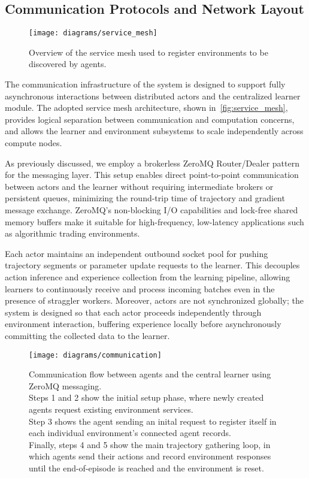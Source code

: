 \documentclass[11pt]{article}
\begin{document}
    \subsection{Communication Protocols and Network Layout}
    \label{subsec:communication}

    \begin{figure}[htb]
        \centering
        \texttt{[image: diagrams/service\_mesh]}
        \caption{Overview of the service mesh used to register environments to be discovered by agents.}
        \label{fig:service_mesh}
    \end{figure}

    The communication infrastructure of the system is designed to support fully asynchronous interactions
    between distributed actors and the centralized learner module.
    The adopted service mesh architecture, shown in~\autoref{fig:service_mesh}, provides logical separation between communication and computation concerns,
    and allows the learner and environment subsystems to scale independently across compute nodes.

    As previously discussed, we employ a brokerless ZeroMQ Router/Dealer pattern for the messaging layer.
    This setup enables direct point-to-point communication between actors and the learner without requiring intermediate brokers or persistent queues,
    minimizing the round-trip time of trajectory and gradient message exchange.
    ZeroMQ's non-blocking I/O capabilities and lock-free shared memory buffers make it suitable for high-frequency,
    low-latency applications such as algorithmic trading environments.

    Each actor maintains an independent outbound socket pool for pushing trajectory segments or parameter update requests to the learner.
    This decouples action inference and experience collection from the learning pipeline,
    allowing learners to continuously receive and process incoming batches even in the presence of straggler workers.
    Moreover, actors are not synchronized globally; the system is designed so that each actor proceeds independently through environment interaction,
    buffering experience locally before asynchronously committing the collected data to the learner.

    \begin{figure}[htb]
        \centering
        \texttt{[image: diagrams/communication]}
        \caption{
            Communication flow between agents and the central learner using ZeroMQ messaging.\\
            Steps 1 and 2 show the initial setup phase, where newly created agents request existing environment services.\\
            Step 3 shows the agent sending an inital request to register itself in each individual environment's connected agent records.\\
            Finally, steps 4 and 5 show the main trajectory gathering loop, in which agents send their actions and
            record environment responses until the end-of-episode is reached and the environment is reset.
        }
        \label{fig:communication}
    \end{figure}
\end{document}
